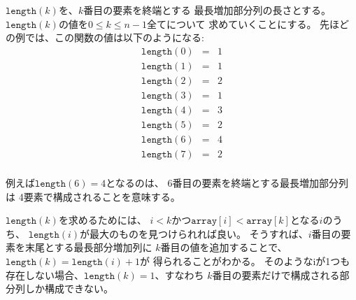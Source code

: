 \begin{comment}
Let $\texttt{length}(k)$ denote
the length of the
longest increasing subsequence
that ends at position $k$.
Thus, if we calculate all values of
$\texttt{length}(k)$ where $0 \le k \le n-1$,
we will find out the length of the
longest increasing subsequence.
For example, the values of the function
for the above array are as follows:
\end{comment}


$\texttt{length}(k)$を、$k$番目の要素を終端とする
最長増加部分列の長さとする。
$\texttt{length}(k)$の値を$0 \le k \le n-1$全てについて
求めていくことにする。
先ほどの例では、この関数の値は以下のようになる:
\[
\begin{array}{lcl}
\texttt{length}(0) & = & 1 \\
\texttt{length}(1) & = & 1 \\
\texttt{length}(2) & = & 2 \\
\texttt{length}(3) & = & 1 \\
\texttt{length}(4) & = & 3 \\
\texttt{length}(5) & = & 2 \\
\texttt{length}(6) & = & 4 \\
\texttt{length}(7) & = & 2 \\
\end{array}
\]

\begin{comment}
For example, $\texttt{length}(6)=4$,
because the longest increasing subsequence
that ends at position 6 consists of 4 elements.

To calculate a value of $\texttt{length}(k)$,
we should find a position $i<k$
for which $\texttt{array}[i]<\texttt{array}[k]$
and $\texttt{length}(i)$ is as large as possible.
Then we know that
$\texttt{length}(k)=\texttt{length}(i)+1$,
because this is an optimal way to add
$\texttt{array}[k]$ to a subsequence.
However, if there is no such position $i$,
then $\texttt{length}(k)=1$,
which means that the subsequence only contains
$\texttt{array}[k]$.
\end{comment}

例えば$\texttt{length}(6)=4$となるのは、
6番目の要素を終端とする最長増加部分列は
4要素で構成されることを意味する。

$\texttt{length}(k)$を求めるためには、
$i<k$かつ$\texttt{array}[i]<\texttt{array}[k]$となる$i$のうち、
$\texttt{length}(i)$が最大のものを見つけられれば良い。
そうすれば、$i$番目の要素を末尾とする最長部分増加列に
$k$番目の値を追加することで、$\texttt{length}(k)=\texttt{length}(i)+1$が
得られることがわかる。
そのようなiが1つも存在しない場合、$\texttt{length}(k)=1$、すなわち
$k$番目の要素だけで構成される部分列しか構成できない。

